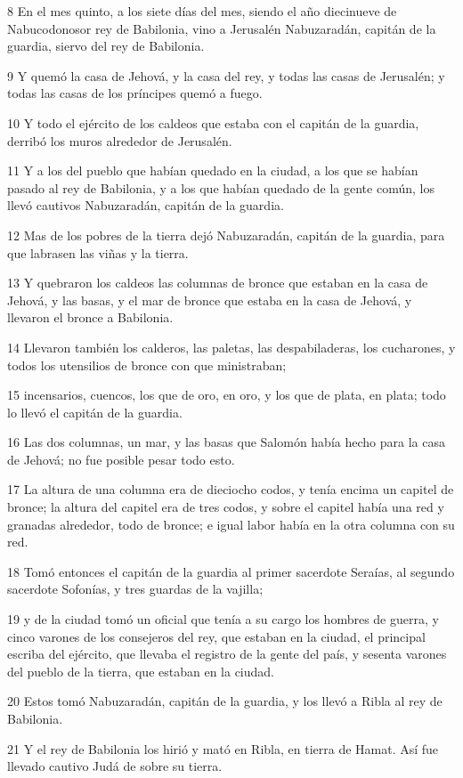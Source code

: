 \par 8 En el mes quinto, a los siete días del mes, siendo el año diecinueve de Nabucodonosor rey de Babilonia, vino a Jerusalén Nabuzaradán, capitán de la guardia, siervo del rey de Babilonia.
\par 9 Y quemó la casa de Jehová, y la casa del rey, y todas las casas de Jerusalén; y todas las casas de los príncipes quemó a fuego.
\par 10 Y todo el ejército de los caldeos que estaba con el capitán de la guardia, derribó los muros alrededor de Jerusalén.
\par 11 Y a los del pueblo que habían quedado en la ciudad, a los que se habían pasado al rey de Babilonia, y a los que habían quedado de la gente común, los llevó cautivos Nabuzaradán, capitán de la guardia.
\par 12 Mas de los pobres de la tierra dejó Nabuzaradán, capitán de la guardia, para que labrasen las viñas y la tierra.
\par 13 Y quebraron los caldeos las columnas de bronce que estaban en la casa de Jehová, y las basas, y el mar de bronce que estaba en la casa de Jehová, y llevaron el bronce a Babilonia.
\par 14 Llevaron también los calderos, las paletas, las despabiladeras, los cucharones, y todos los utensilios de bronce con que ministraban; 
\par 15 incensarios, cuencos, los que de oro, en oro, y los que de plata, en plata; todo lo llevó el capitán de la guardia.
\par 16 Las dos columnas, un mar, y las basas que Salomón había hecho para la casa de Jehová; no fue posible pesar todo esto.
\par 17 La altura de una columna era de dieciocho codos,  y tenía encima un capitel de bronce; la altura del capitel era de tres codos, y sobre el capitel había una red y granadas alrededor, todo de bronce; e igual labor había en la otra columna con su red.
\par 18 Tomó entonces el capitán de la guardia al primer sacerdote Seraías, al segundo sacerdote Sofonías, y tres guardas de la vajilla;
\par 19 y de la ciudad tomó un oficial que tenía a su cargo los hombres de guerra, y cinco varones de los consejeros del rey, que estaban en la ciudad, el principal escriba del ejército, que llevaba el registro de la gente del país, y sesenta varones del pueblo de la tierra, que estaban en la ciudad.
\par 20 Estos tomó Nabuzaradán, capitán de la guardia, y los llevó a Ribla al rey de Babilonia.
\par 21 Y el rey de Babilonia los hirió y mató en Ribla, en tierra de Hamat. Así fue llevado cautivo Judá de sobre su tierra.

